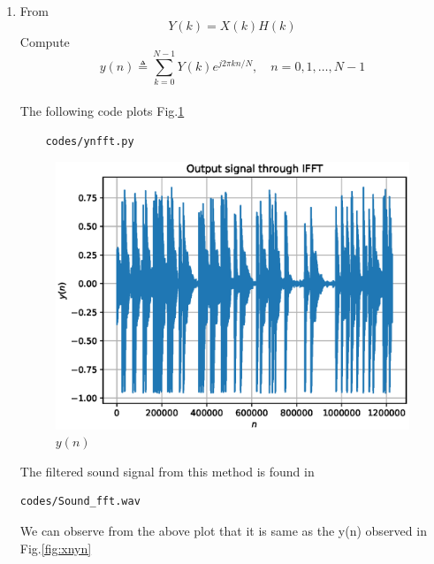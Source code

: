 \documentclass[journal,12pt,twocolumn]{IEEEtran}
\renewcommand\thesection{\arabic{section}}
\begin{document}
\begin{enumerate}[label=\thesection.\arabic*
,ref=\thesection.\theenumi]
\item From
\begin{equation}
Y(k) = X(k)H(k)
\end{equation}
Compute
\begin{equation}
y(n) \triangleq \sum_{k=0}^{N-1} Y(k) e^{j 2 \pi k n / N}, \quad n=0,1, \ldots, N-1
\end{equation}
\\
\solution
The following code plots Fig.\ref{fig:ynfft}
\begin{lstlisting}
    codes/ynfft.py
\end{lstlisting}
\begin{figure}[!ht]
\centering
\includegraphics[width=\columnwidth]{./figs/ynfft.eps}
\caption{$y(n)$}
\label{fig:ynfft}
\end{figure}

The filtered sound signal from this method is found in
\begin{lstlisting}
codes/Sound_fft.wav
\end{lstlisting}
We can observe from the above plot that it is same as the y(n) observed in Fig.\ref{fig:xnyn}
\end{enumerate}
\end{document}
